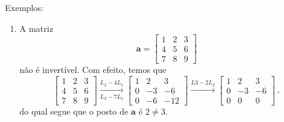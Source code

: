 \documentclass[12pt,a4paper]{report}
\newcommand{\mb}{\mathbf}
\begin{document}
Exemplos:
\begin{enumerate}
  \item A matriz
  $$\mb a=\begin{bmatrix}
    1&2&3\\
    4&5&6\\
    7&8&9
  \end{bmatrix}$$
  não é invertível. Com efeito, temos que
  $$\begin{bmatrix}
    1&2&3\\
    4&5&6\\
    7&8&9
  \end{bmatrix}\xrightarrow[L_3-7L_1]{L_2-4L_1} \begin{bmatrix}
    1&2&3\\
    0&-3&-6\\
    0&-6&-12
  \end{bmatrix}\xrightarrow{L3-2L_2} \begin{bmatrix}
    1&2&3\\
    0&-3&-6\\
    0&0&0
  \end{bmatrix}\,,$$
  do qual segue que o posto de $\mb a$ é $2\ne 3$.
\end{enumerate}
\end{document}
